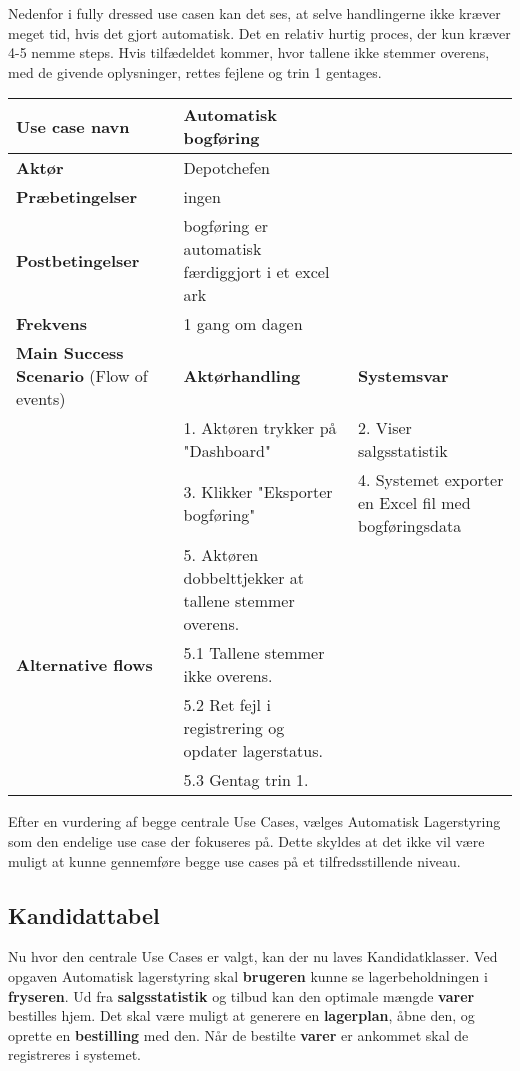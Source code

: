 Nedenfor i fully dressed use casen kan det ses, at selve handlingerne ikke kræver meget tid, hvis det gjort automatisk. Det en relativ hurtig proces, der kun kræver 4-5 nemme steps. 
Hvis tilfædeldet kommer, hvor tallene ikke stemmer overens, med de givende oplysninger, rettes fejlene og trin 1 gentages. 

\begin{longtable}{ |p{120pt}|p{120pt}|p{120pt}| }
    \hline
    \textbf{Use case navn} & Automatisk bogføring & \\
    \hline
    \textbf{Aktør} & Depotchefen & \\
    \hline
    \textbf{Præbetingelser} & ingen & \\
    \hline
    \textbf{Postbetingelser} & bogføring er automatisk færdiggjort i et excel ark & \\
    \hline
    \textbf{Frekvens} & 1 gang om dagen & \\
    \hline
    \textbf{Main Success Scenario} (Flow of events) & \textbf{Aktørhandling} & \textbf{Systemsvar} \\
    \hline
    & 1. Aktøren trykker på "Dashboard" & 2. Viser salgsstatistik \\
    \hline
    & 3. Klikker "Eksporter bogføring" & 4. Systemet exporter en Excel fil med bogføringsdata \\
    \hline
    & 5. Aktøren dobbelttjekker at tallene stemmer overens. & \\
    \hline
    \textbf{Alternative flows} & 5.1 Tallene stemmer ikke overens. & \\
    \hline 
    & 5.2 Ret fejl i registrering og opdater lagerstatus. & \\
    \hline
    & 5.3 Gentag trin 1. & \\
    \hline
\end{longtable}

Efter en vurdering af begge centrale Use Cases, vælges Automatisk Lagerstyring som den endelige use case der fokuseres på. Dette skyldes at det ikke vil være muligt at kunne gennemføre begge use cases på et tilfredsstillende niveau.

\subsection{Kandidattabel}
Nu hvor den centrale Use Cases er valgt, kan der nu laves Kandidatklasser. 
Ved opgaven Automatisk lagerstyring skal \textbf{brugeren} kunne se lagerbeholdningen i \textbf{fryseren}. Ud fra \textbf{salgsstatistik} og tilbud kan den optimale mængde \textbf{varer} bestilles hjem. Det skal være muligt at generere en \textbf{lagerplan}, åbne den, og oprette en \textbf{bestilling} med den. Når de bestilte \textbf{varer} er ankommet skal de registreres i systemet.




